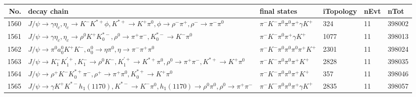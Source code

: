 \begin{table}[htbp] 
\begin{center}
\begin{small}
\begin{tabular}{rlllll}\hline\hline
 No. & decay chain & final states &  iTopology & nEvt & nTot \\\hline
1560&$J/\psi       \rightarrow \gamma       \eta_{c}    , \eta_{c}     \rightarrow K^{-}          K^{*+}         \phi           , K^{*+}          \rightarrow K^{+}          \pi^{0}        , \phi            \rightarrow \rho^{-}      \pi^{+}        , \rho^{-}       \rightarrow \pi^{-}        \pi^{0}        $&$\pi^{-}        K^{-}          \pi^{0}        \pi^{0}        \pi^{+}        \gamma       K^{+}          $&  324&   11&398002\\
1561&$J/\psi       \rightarrow \gamma       \eta_{c}    , \eta_{c}     \rightarrow \rho^{0}      K^{+}          K_{0}^{*-}     , \rho^{0}       \rightarrow \pi^{+}        \pi^{-}        , K_{0}^{*-}      \rightarrow K^{-}          \pi^{0}        $&$\pi^{-}        K^{-}          \pi^{0}        \pi^{+}        \gamma       K^{+}          $& 1077&   11&398013\\
1562&$J/\psi       \rightarrow \pi^{0}        a_{0}^{0}      K^{+}          K^{-}          , a_{0}^{0}       \rightarrow \eta          \pi^{0}        , \eta           \rightarrow \pi^{-}        \pi^{+}        \pi^{0}        $&$\pi^{-}        K^{-}          \pi^{0}        \pi^{0}        \pi^{0}        \pi^{+}        K^{+}          $& 2301&   11&398024\\
1563&$J/\psi       \rightarrow K_{1}^{-}      K_1^{'+}      , K_{1}^{-}       \rightarrow \rho^{0}      K^{-}          , K_1^{'+}       \rightarrow K^{*+}         \pi^{0}        , \rho^{0}       \rightarrow \pi^{+}        \pi^{-}        , K^{*+}          \rightarrow K^{+}          \pi^{0}        $&$\pi^{-}        K^{-}          \pi^{0}        \pi^{0}        \pi^{+}        K^{+}          $& 2828&   11&398035\\
1564&$J/\psi       \rightarrow \rho^{+}      K^{-}          K_{0}^{*+}     \pi^{-}        , \rho^{+}       \rightarrow \pi^{+}        \pi^{0}        , K_{0}^{*+}      \rightarrow K^{+}          \pi^{0}        $&$\pi^{-}        K^{-}          \pi^{0}        \pi^{0}        \pi^{+}        K^{+}          $&  357&   11&398046\\
1565&$J/\psi       \rightarrow \gamma       K^{+}          K^{*-}         h_{1}(1170)    , K^{*-}          \rightarrow K^{-}          \pi^{0}        , h_{1}(1170)     \rightarrow \rho^{0}      \pi^{0}        , \rho^{0}       \rightarrow \pi^{+}        \pi^{-}        $&$\pi^{-}        K^{-}          \pi^{0}        \pi^{0}        \pi^{+}        \gamma       K^{+}          $& 2835&   11&398057\\

\end{tabular}
\end{small}
\end{center}
\end{table}
